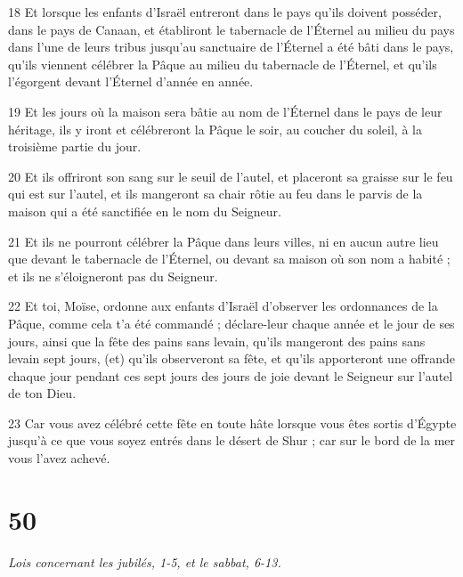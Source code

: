 \par 18 Et lorsque les enfants d'Israël entreront dans le pays qu'ils doivent posséder, dans le pays de Canaan, et établiront le tabernacle de l'Éternel au milieu du pays dans l'une de leurs tribus jusqu'au sanctuaire de l'Éternel a été bâti dans le pays, qu'ils viennent célébrer la Pâque au milieu du tabernacle de l'Éternel, et qu'ils l'égorgent devant l'Éternel d'année en année.
\par 19 Et les jours où la maison sera bâtie au nom de l'Éternel dans le pays de leur héritage, ils y iront et célébreront la Pâque le soir, au coucher du soleil, à la troisième partie du jour.
\par 20 Et ils offriront son sang sur le seuil de l'autel, et placeront sa graisse sur le feu qui est sur l'autel, et ils mangeront sa chair rôtie au feu dans le parvis de la maison qui a été sanctifiée en le nom du Seigneur.
\par 21 Et ils ne pourront célébrer la Pâque dans leurs villes, ni en aucun autre lieu que devant le tabernacle de l'Éternel, ou devant sa maison où son nom a habité ; et ils ne s'éloigneront pas du Seigneur.
\par 22 Et toi, Moïse, ordonne aux enfants d'Israël d'observer les ordonnances de la Pâque, comme cela t'a été commandé ; déclare-leur chaque année et le jour de ses jours, ainsi que la fête des pains sans levain, qu'ils mangeront des pains sans levain sept jours, (et) qu'ils observeront sa fête, et qu'ils apporteront une offrande chaque jour pendant ces sept jours des jours de joie devant le Seigneur sur l'autel de ton Dieu.
\par 23 Car vous avez célébré cette fête en toute hâte lorsque vous êtes sortis d'Égypte jusqu'à ce que vous soyez entrés dans le désert de Shur ; car sur le bord de la mer vous l'avez achevé.

\chapter{50}

\par \textit{Lois concernant les jubilés, 1-5, et le sabbat, 6-13.}


